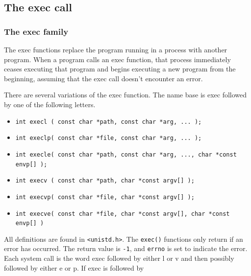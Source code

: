 \documentclass[a4paper]{article}
\begin{document}
\subsection{The exec call}


\subsubsection{The exec family}
The exec functions replace the program running in a process with another program.
When a program calls an exec function, that process immediately ceases executing that
program and begins executing a new program from the beginning, assuming that the
exec call doesn't encounter an error.

There are several variations of the exec function. The name base is exec followed by one of the following letters.
\begin{itemize}
    \item \texttt{int execl ( const char *path, const char *arg, ... );}
    \item \texttt{int execlp( const char *file, const char *arg, ... );}
    \item \texttt{int execle( const char *path, const char *arg, ..., char *const envp[] );}
    \item \texttt{int execv ( const char *path, char *const argv[] );}
    \item \texttt{int execvp( const char *file, char *const argv[] );}
    \item \texttt{int execve( const char *file, char *const argv[], char *const envp[] )}
\end{itemize}
All definitions are found in \texttt{<unistd.h>}. The \texttt{exec()} functions only return if an error has occurred. The return value is \texttt{-1}, and \texttt{errno} is set to indicate the error. Each system call is the word exec followed by either l or v and then possibly followed by either e or p. If exec is followed by
\end{document}
